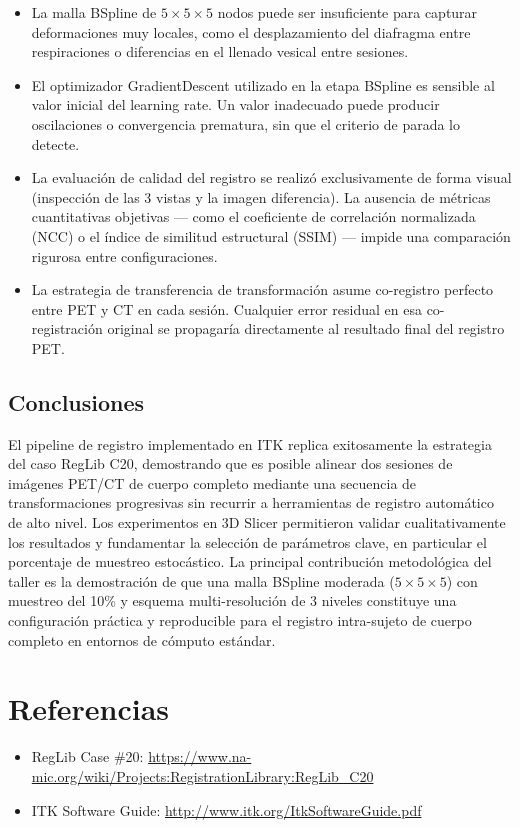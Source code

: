 \documentclass[12pt, letterpaper]{article}
\begin{document}
\begin{itemize}
    \item La malla BSpline de $5\times5\times5$ nodos puede ser insuficiente para capturar
    deformaciones muy locales, como el desplazamiento del diafragma entre
    respiraciones o diferencias en el llenado vesical entre sesiones.

    \item El optimizador GradientDescent utilizado en la etapa BSpline es sensible
    al valor inicial del learning rate. Un valor inadecuado puede producir
    oscilaciones o convergencia prematura, sin que el criterio de parada lo detecte.

    \item La evaluación de calidad del registro se realizó exclusivamente de forma
    visual (inspección de las 3 vistas y la imagen diferencia). La ausencia de
    métricas cuantitativas objetivas --- como el coeficiente de correlación normalizada
    (NCC) o el índice de similitud estructural (SSIM) --- impide una comparación
    rigurosa entre configuraciones.

    \item La estrategia de transferencia de transformación asume co-registro perfecto
    entre PET y CT en cada sesión. Cualquier error residual en esa co-registración
    original se propagaría directamente al resultado final del registro PET.
\end{itemize}

\subsection{Conclusiones}

El pipeline de registro implementado en ITK replica exitosamente la estrategia
del caso RegLib C20, demostrando que es posible alinear dos sesiones de imágenes
PET/CT de cuerpo completo mediante una secuencia de transformaciones progresivas
sin recurrir a herramientas de registro automático de alto nivel. Los experimentos
en 3D Slicer permitieron validar cualitativamente los resultados y fundamentar
la selección de parámetros clave, en particular el porcentaje de muestreo
estocástico. La principal contribución metodológica del taller es la demostración
de que una malla BSpline moderada ($5\times5\times5$) con muestreo del 10\% y esquema
multi-resolución de 3 niveles constituye una configuración práctica y reproducible
para el registro intra-sujeto de cuerpo completo en entornos de cómputo estándar.

\section{Referencias}
\begin{itemize}
    \item RegLib Case \#20: \url{https://www.na-mic.org/wiki/Projects:RegistrationLibrary:RegLib_C20}
    \item ITK Software Guide: \url{http://www.itk.org/ItkSoftwareGuide.pdf}
\end{itemize}
\end{document}
